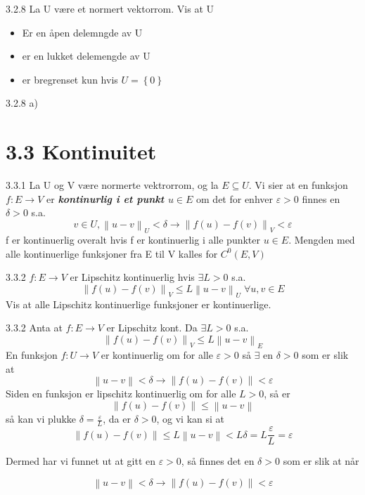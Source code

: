 \documentclass[a4paper,norsk]{article}
\renewcommand{\leq}{\leqslant}
\newcommand{\eps} {\varepsilon}
\renewcommand{\epsilon}{\varepsilon}
\begin{document}
\begin{oppgavebox}{3.2.8}{}
La U være et normert vektorrom. Vis at U
\begin{itemize}
    \item Er en åpen delemngde av U
    \item er en lukket delemengde av U
    \item er bregrenset kun hvis $ U = \left\{ 0 \right\}  $ 
\end{itemize}

\begin{proofbox}{3.2.8 a)}{}

\end{proofbox}
\end{oppgavebox}


\section*{3.3 Kontinuitet}

\begin{definitionbox}{3.3.1}{}
La U og V være normerte vektrorrom, og la $ E \subseteq U $. Vi sier at en funksjon $ f: E \to V $  er \textbf{\textit{kontinurlig i et punkt $ u \in E $ }} om det for enhver $ \eps > 0 $ finnes en $ \delta > 0 $ s.a.
\[
    v \in U, \left\lVert u - v \right\rVert_U < \delta \rightarrow \left\lVert f(u) - f(v) \right\rVert _V < \eps
\]
f er kontinuerlig overalt hvis f er kontinuerlig i alle punkter $ u \in E $. Mengden med alle kontinuerlige funksjoner fra E til V kalles for $ C^0 \left( E, V \right)  $ 
\end{definitionbox}

\begin{oppgavebox}{3.3.2}{}
$ f: E \to V $ er Lipschitz kontinuerlig hvis $ \exists L > 0 $ s.a.
\[
    \left\lVert f(u) - f(v) \right\rVert _V \leq L \left\lVert u - v \right\rVert _U \; \forall u, v \in E
\]
Vis at alle Lipschitz kontinuerlige funksjoner er kontinuerlige.
\begin{proofbox}{3.3.2}{}
Anta at $ f: E \to V $ er Lipschitz kont. Da $ \exists L >0 $ s.a.
\[
    \left\lVert f(u) - f(v) \right\rVert _V \leq L \left\lVert u - v \right\rVert _E
\]
En funksjon $ f: U \to V $ er kontinuerlig om for alle $ \epsilon > 0 $ så $ \exists $ en $ \delta > 0 $ som er slik at 
\[
    \left\lVert u - v \right\rVert  < \delta \rightarrow \left\lVert f(u) - f(v) \right\rVert <\epsilon 
\]
Siden en funksjon er lipschitz kontinuerlig om for alle $ L > 0 $, så er
\[
    \left\lVert f(u) - f(v) \right\rVert \leq \left\lVert u - v \right\rVert 
\]
så kan vi plukke $ \delta = \frac{ \epsilon }{ L } $, da er $ \delta > 0 $, og vi kan si at 
\[
    \left\lVert f(u) - f(v) \right\rVert \leq L \left\lVert u - v \right\rVert < L \delta = L \frac{ \epsilon }{ L } = \epsilon 
\]

Dermed har vi funnet ut at gitt en $ \epsilon >0 $, så finnes det en $ \delta > 0 $ som er slik at når 

\[
    \left\lVert u - v \right\rVert < \delta \rightarrow \left\lVert f(u) - f(v) \right\rVert < \epsilon 
\]

\end{proofbox}
\end{oppgavebox}
\end{document}
